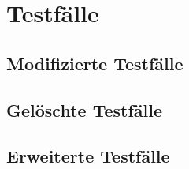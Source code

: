 \section{Testfälle}

\subsection{Modifizierte Testfälle}

\subsection{Gelöschte Testfälle}

\subsection{Erweiterte Testfälle}




